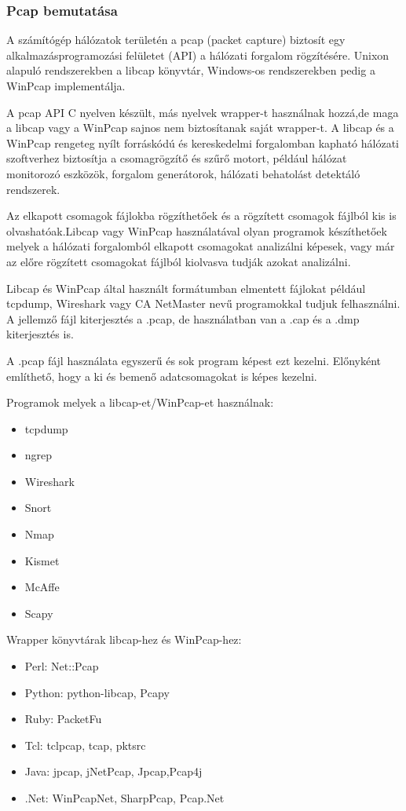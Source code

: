 \documentclass[a4paper,12pt,oneside]{report}
\begin{document}
\subsubsection{Pcap bemutatása}

A számítógép hálózatok területén a pcap (packet capture) biztosít egy
alkalmazásprogramozási felületet (API) a hálózati forgalom rögzítésére.
Unixon alapuló rendszerekben a libcap könyvtár, Windows-os rendszerekben
pedig a WinPcap implementálja.

A pcap API C nyelven készült, más nyelvek wrapper-t használnak hozzá,de maga
a libcap vagy a WinPcap sajnos nem biztosítanak saját wrapper-t.
A libcap és a WinPcap rengeteg nyílt forráskódú és kereskedelmi forgalomban
kapható hálózati szoftverhez biztosítja a csomagrögzítő és szűrő motort, például
hálózat monitorozó eszközök, forgalom generátorok, hálózati behatolást detektáló
rendszerek.

Az elkapott csomagok fájlokba rögzíthetőek és a rögzített csomagok fájlból kis is
olvashatóak.Libcap vagy WinPcap használatával olyan programok készíthetőek melyek a
hálózati forgalomból elkapott csomagokat analizálni képesek, vagy már az előre
rögzített csomagokat fájlból kiolvasva tudják azokat analizálni.

Libcap és WinPcap által használt formátumban elmentett fájlokat például
tcpdump, Wireshark vagy CA NetMaster nevű programokkal tudjuk felhasználni.
A jellemző fájl kiterjesztés a .pcap, de használatban van a .cap és a .dmp
kiterjesztés is.

A .pcap fájl használata egyszerű és sok program képest ezt kezelni.
Előnyként említhető, hogy a ki és bemenő adatcsomagokat is képes kezelni.

Programok melyek a libcap-et/WinPcap-et használnak:

\begin{itemize}
    \itemsep0em
        \item tcpdump
        \item ngrep
        \item Wireshark
        \item Snort
        \item Nmap
        \item Kismet
        \item McAffe
        \item Scapy
\end{itemize}

Wrapper könyvtárak libcap-hez és WinPcap-hez:
\begin{itemize}
\itemsep0em
        \item Perl: Net::Pcap
        \item Python: python-libcap, Pcapy
        \item Ruby: PacketFu
        \item Tcl: tclpcap, tcap, pktsrc
        \item Java: jpcap, jNetPcap, Jpcap,Pcap4j
        \item .Net: WinPcapNet, SharpPcap, Pcap.Net
\end{itemize}
\end{document}
